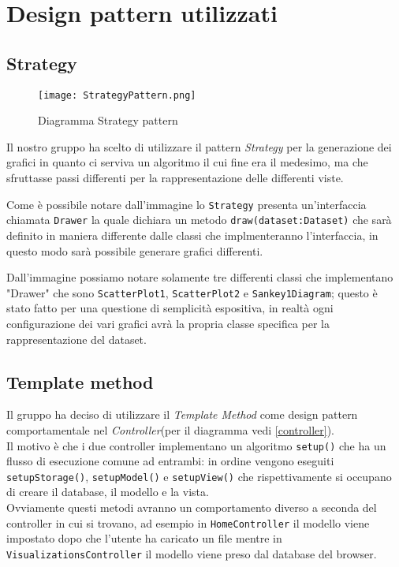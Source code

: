 \section{Design pattern utilizzati}
\subsection{Strategy}
\begin{figure}[H]
	\centering
	\texttt{[image: StrategyPattern.png]}
	\caption{Diagramma Strategy pattern}
  \end{figure}
Il nostro gruppo ha scelto di utilizzare il pattern \textit{Strategy} per la generazione dei grafici in quanto ci serviva un algoritmo il cui fine era il medesimo, ma che sfruttasse passi differenti per la rappresentazione delle differenti viste.

Come è possibile notare dall'immagine lo \texttt{Strategy} presenta un'interfaccia chiamata \texttt{Drawer} la quale dichiara un metodo \texttt{draw(dataset:Dataset)} che sarà definito in maniera differente dalle classi che implmenteranno l'interfaccia, in questo modo sarà possibile generare grafici differenti.

Dall'immagine possiamo notare solamente tre differenti classi che implementano "Drawer" che sono \texttt{ScatterPlot1}, \texttt{ScatterPlot2} e \texttt{Sankey1Diagram}; questo è stato fatto per una questione di semplicità espositiva, in realtà ogni configurazione dei vari grafici avrà la propria classe specifica per la rappresentazione del dataset. \\

\subsection{Template method}
Il gruppo ha deciso di utilizzare il \textit{Template Method} come design pattern comportamentale nel \textit{Controller}(per il diagramma vedi \ref{controller}). \\Il motivo è che i due controller implementano un algoritmo \texttt{setup()} che ha un flusso di esecuzione comune ad entrambi: in ordine vengono eseguiti \texttt{setupStorage()}, \texttt{setupModel()} e \texttt{setupView()} che rispettivamente si occupano di creare il database, il modello e la vista. \\Ovviamente questi metodi avranno un comportamento diverso a seconda del controller in cui si trovano, ad esempio in \texttt{HomeController} il modello viene impostato dopo che l'utente ha caricato un file mentre in \texttt{VisualizationsController} il modello viene preso dal database del browser.
